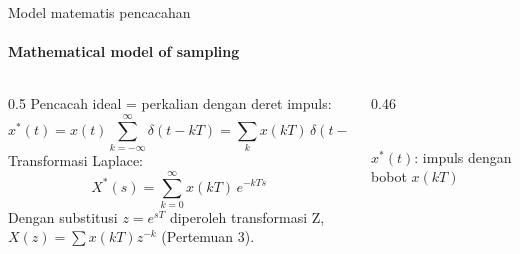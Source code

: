 \documentclass[aspectratio=169,10pt]{beamer}
\begin{document}
\begin{frame}{Model matematis pencacahan}
	\framesubtitle{Mathematical model of sampling}
	\begin{columns}[c]
		\begin{column}{0.5\textwidth}
			\small
			Pencacah ideal = perkalian dengan deret impuls:
			\[
				x^*(t) = x(t)\sum_{k=-\infty}^{\infty}\delta(t-kT) = \sum_k x(kT)\,\delta(t-kT)
			\]
			Transformasi Laplace:
			\[
				X^*(s) = \sum_{k=0}^{\infty} x(kT)\,e^{-kTs}
			\]
			Dengan substitusi $z = e^{sT}$ diperoleh transformasi Z, $X(z)=\sum x(kT)z^{-k}$ (Pertemuan 3).
		\end{column}
		\begin{column}{0.46\textwidth}
			\centering
			\\
			{\scriptsize $x^*(t)$: impuls dengan bobot $x(kT)$}
		\end{column}
	\end{columns}
\end{frame}
\end{document}
